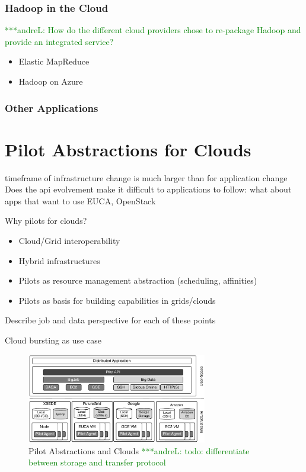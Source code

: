 \documentclass[times]{cpeauth}
\newcommand{\alnote}[1]{ {\textcolor{green} { ***andreL: #1 }}}
\newcommand{\alnote}[1]{}
\begin{document}
\subsubsection{Hadoop in the Cloud}

\alnote{How do the different cloud providers chose to re-package Hadoop and 
provide an integrated service?}

\begin{itemize}
	\item Elastic MapReduce
	\item Hadoop on Azure
\end{itemize}

\subsubsection{Other Applications}







\section{Pilot Abstractions for Clouds}

timeframe of infrastructure change is much larger than for application change
Does the api evolvement make it difficult to applications to follow: what about apps that want to use EUCA, OpenStack

Why pilots for clouds?
\begin{itemize}
	\item Cloud/Grid interoperability
	\item Hybrid infrastructures 
	\item Pilots as resource management abstraction (scheduling, affinities)
	\item Pilots as basis for building capabilities in grids/clouds
\end{itemize}

Describe job and data perspective for each of these points


Cloud bursting as use case


\begin{figure}[t]
	\centering
		\includegraphics[width=0.7\textwidth]{figures/cloud_pilot_job.pdf}
	\caption{Pilot Abstractions and Clouds\alnote{todo: differentiate between 
	storage and transfer protocol}}
	\label{fig:figures_cloud_pilot_job}
\end{figure}
\end{document}
